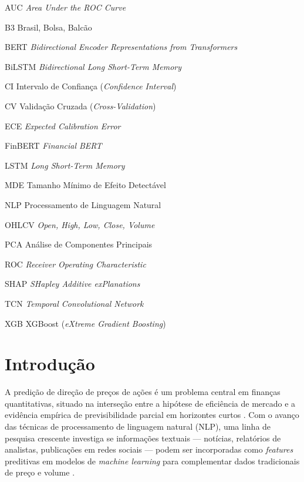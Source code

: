 \documentclass[
    12pt,
    openright,
    oneside,
    a4paper,
    english,
    brazil
]{abntex2}
\begin{document}
\begin{siglas}
    \item[AUC] \textit{Area Under the ROC Curve}
    \item[B3] Brasil, Bolsa, Balcão
    \item[BERT] \textit{Bidirectional Encoder Representations from Transformers}
    \item[BiLSTM] \textit{Bidirectional Long Short-Term Memory}
    \item[CI] Intervalo de Confiança (\textit{Confidence Interval})
    \item[CV] Validação Cruzada (\textit{Cross-Validation})
    \item[ECE] \textit{Expected Calibration Error}
    \item[FinBERT] \textit{Financial BERT}
    \item[LSTM] \textit{Long Short-Term Memory}
    \item[MDE] Tamanho Mínimo de Efeito Detectável
    \item[NLP] Processamento de Linguagem Natural
    \item[OHLCV] \textit{Open, High, Low, Close, Volume}
    \item[PCA] Análise de Componentes Principais
    \item[ROC] \textit{Receiver Operating Characteristic}
    \item[SHAP] \textit{SHapley Additive exPlanations}
    \item[TCN] \textit{Temporal Convolutional Network}
    \item[XGB] XGBoost (\textit{eXtreme Gradient Boosting})
\end{siglas}

\tableofcontents*
\cleardoublepage

\textual

\chapter{Introdução}\label{cap:introducao}

A predição de direção de preços de ações é um problema central em finanças quantitativas, situado na interseção entre a hipótese de eficiência de mercado \cite{fama1970} e a evidência empírica de previsibilidade parcial em horizontes curtos \cite{lo2004}. Com o avanço das técnicas de processamento de linguagem natural (NLP), uma linha de pesquisa crescente investiga se informações textuais --- notícias, relatórios de analistas, publicações em redes sociais --- podem ser incorporadas como \textit{features} preditivas em modelos de \textit{machine learning} para complementar dados tradicionais de preço e volume \cite{xu2018,araci2019}.
\end{document}
